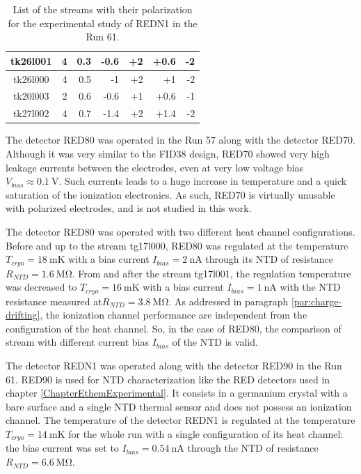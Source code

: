 \begin{table}[]
\begin{tabular}{c|rrrrrr}
tk26l001  & 4                  & 0.3                  & -0.6                  & +2                  & +0.6                  & -2                  \\ \hline
tk26l000  & 4                  & 0.5                  & -1                    & +2                  & +1                    & -2                  \\ \hline
tk20l003  & 2                  & 0.6                  & -0.6                  & +1                  & +0.6                  & -1                  \\ \hline
tk27l002  & 4                  & 0.7                  & -1.4                  & +2                  & +1.4                  & -2                 
\end{tabular}%
\caption{List of the streams with their polarization for the experimental study of REDN1 in the Run 61.}
\label{tab:redn1-stream-list}
\end{table}

The detector RED80 was operated in the Run 57 along with the detector RED70. Although it was very similar to the FID38 design, RED70 showed very high leakage currents between the electrodes, even at very low voltage bias $V_{bias} \approx \SI{0.1}{\volt}$. Such currents leads to a huge increase in temperature and a quick saturation of the ionization electronics. As such, RED70 is virtually unusable with polarized electrodes, and is not studied in this work.

The detector RED80 was operated with two different heat channel configurations. Before and up to the stream tg17l000, RED80 was regulated at the temperature $T_{cryo}=\SI{18}{\milli\kelvin}$ with a bias current $I_{bias} = \SI{2}{\nano\ampere}$ through its NTD of resistance $R_{NTD}=\SI{1.6}{\mega\ohm}$. From and after the stream tg17l001, the regulation temperature was decreased to $T_{cryo}=\SI{16}{\milli\kelvin}$ with a bias current $I_{bias} = \SI{1}{\nano\ampere}$ with the NTD resistance measured at$R_{NTD}=\SI{3.8}{\mega\ohm}$.
As addressed in paragraph \ref{par:charge-drifting}, the ionization channel performance are independent from the configuration of the heat channel. So, in the case of RED80, the comparison of stream with different current bias $I_{bias}$ of the NTD is valid.

The detector REDN1 was operated along with the detector RED90 in the Run 61. RED90 is used for NTD characterization like the RED detectors used in chapter \ref{ChapterEthemExperimental}. It consists in a germanium crystal with a bare surface and a single NTD thermal sensor and does not possess an ionization channel.
The temperature of the detector REDN1 is regulated at the temperature $T_{cryo}=\SI{14}{\milli\kelvin}$ for the whole run with a single configuration of its heat channel: the bias current was set to $I_{bias}=\SI{0.54}{\nano\ampere}$ through the NTD of resistance $R_{NTD} = \SI{6.6}{\mega\ohm}$.


